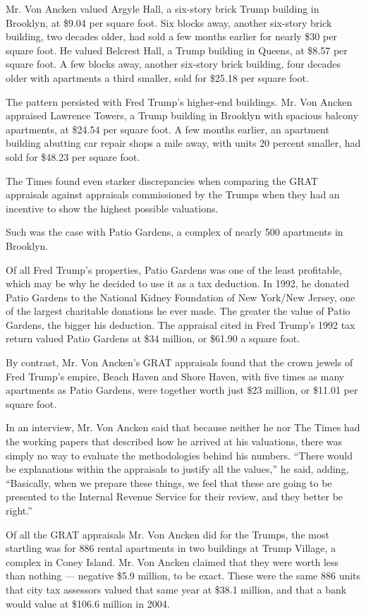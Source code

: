 Mr. Von Ancken valued Argyle Hall, a six-story brick Trump building in
Brooklyn, at \$9.04 per square foot. Six blocks away, another six-story
brick building, two decades older, had sold a few months earlier for
nearly \$30 per square foot. He valued Belcrest Hall, a Trump building
in Queens, at \$8.57 per square foot. A few blocks away, another
six-story brick building, four decades older with apartments a third
smaller, sold for \$25.18 per square foot.

The pattern persisted with Fred Trump's higher-end buildings. Mr. Von
Ancken appraised Lawrence Towers, a Trump building in Brooklyn with
spacious balcony apartments, at \$24.54 per square foot. A few months
earlier, an apartment building abutting car repair shops a mile away,
with units 20 percent smaller, had sold for \$48.23 per square foot.

The Times found even starker discrepancies when comparing the GRAT
appraisals against appraisals commissioned by the Trumps when they had
an incentive to show the highest possible valuations.

Such was the case with Patio Gardens, a complex of nearly 500 apartments
in Brooklyn.

Of all Fred Trump's properties, Patio Gardens was one of the least
profitable, which may be why he decided to use it as a tax deduction. In
1992, he donated Patio Gardens to the National Kidney Foundation of New
York/New Jersey, one of the largest charitable donations he ever made.
The greater the value of Patio Gardens, the bigger his deduction. The
appraisal cited in Fred Trump's 1992 tax return valued Patio Gardens at
\$34 million, or \$61.90 a square foot.

By contrast, Mr. Von Ancken's GRAT appraisals found that the crown
jewels of Fred Trump's empire, Beach Haven and Shore Haven, with five
times as many apartments as Patio Gardens, were together worth just \$23
million, or \$11.01 per square foot.

In an interview, Mr. Von Ancken said that because neither he nor The
Times had the working papers that described how he arrived at his
valuations, there was simply no way to evaluate the methodologies behind
his numbers. ``There would be explanations within the appraisals to
justify all the values,'' he said, adding, ``Basically, when we prepare
these things, we feel that these are going to be presented to the
Internal Revenue Service for their review, and they better be right.''

Of all the GRAT appraisals Mr. Von Ancken did for the Trumps, the most
startling was for 886 rental apartments in two buildings at Trump
Village, a complex in Coney Island. Mr. Von Ancken claimed that they
were worth less than nothing --- negative \$5.9 million, to be exact.
These were the same 886 units that city tax assessors valued that same
year at \$38.1 million, and that a bank would value at \$106.6 million
in 2004.

